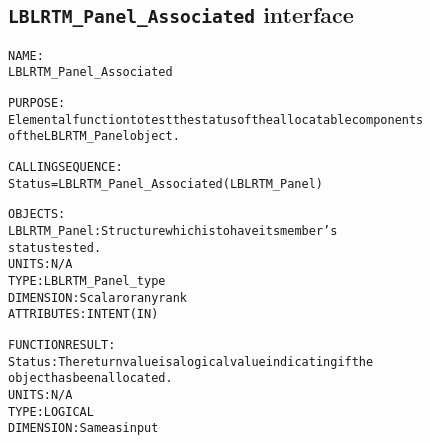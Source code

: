 \subsection{\texttt{LBLRTM\_Panel\_Associated} interface}
  \label{sec:LBLRTM_Panel_Associated_interface}
  \begin{alltt}
 
  NAME:
        LBLRTM_Panel_Associated
 
  PURPOSE:
        Elemental function to test the status of the allocatable components
        of the LBLRTM_Panel object.
 
  CALLING SEQUENCE:
        Status = LBLRTM_Panel_Associated( LBLRTM_Panel )
 
  OBJECTS:
        LBLRTM_Panel:  Structure which is to have its member's
                       status tested.
                       UNITS:      N/A
                       TYPE:       LBLRTM_Panel_type
                       DIMENSION:  Scalar or any rank
                       ATTRIBUTES: INTENT(IN)
 
  FUNCTION RESULT:
        Status:        The return value is a logical value indicating if the
                       object has been allocated.
                       UNITS:      N/A
                       TYPE:       LOGICAL
                       DIMENSION:  Same as input
 
  \end{alltt}
